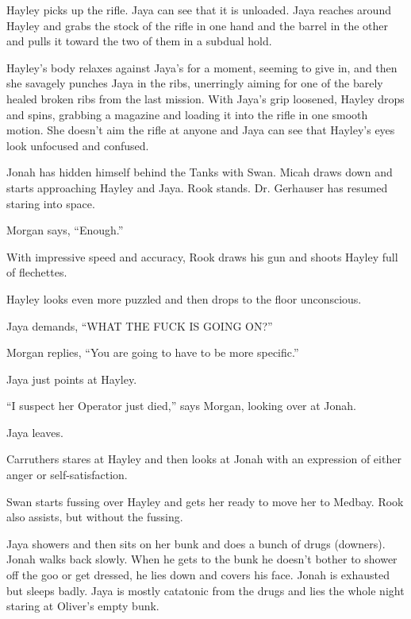 Hayley picks up the rifle.  Jaya can see that it is unloaded.  Jaya reaches around Hayley and grabs the stock of the rifle in one hand and the barrel in the other and pulls it toward the two of them in a subdual hold.



Hayley's body relaxes against Jaya's for a moment, seeming to give in, and then she savagely punches Jaya in the ribs, unerringly aiming for one of the barely healed broken ribs from the last mission.  With Jaya's grip loosened, Hayley drops and spins, grabbing a magazine and loading it into the rifle in one smooth motion.  She doesn't aim the rifle at anyone and Jaya can see that Hayley's eyes look unfocused and confused.



Jonah has hidden himself behind the Tanks with Swan.  Micah draws down and starts approaching Hayley and Jaya.  Rook stands.  Dr. Gerhauser has resumed staring into space.



Morgan says, ``Enough.''

With impressive speed and accuracy, Rook draws his gun and shoots Hayley full of flechettes.

Hayley looks even more puzzled and then drops to the floor unconscious.



Jaya demands, ``WHAT THE FUCK IS GOING ON?''

Morgan replies, ``You are going to have to be more specific.''

Jaya just points at Hayley.

``I suspect her Operator just died,'' says Morgan, looking over at Jonah.

Jaya leaves.

Carruthers stares at Hayley and then looks at Jonah with an expression of either anger or self-satisfaction.

Swan starts fussing over Hayley and gets her ready to move her to Medbay.  Rook also assists, but without the fussing.





Jaya showers and then sits on her bunk and does a bunch of drugs (downers).  Jonah walks back slowly.  When he gets to the bunk he doesn't bother to shower off the goo or get dressed, he lies down and covers his face.  Jonah is exhausted but sleeps badly.  Jaya is mostly catatonic from the drugs and lies the whole night staring at Oliver's empty bunk.




